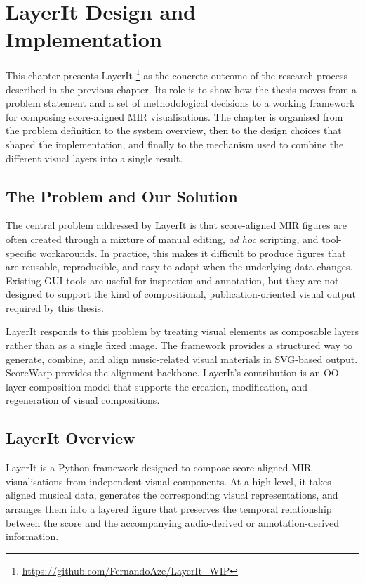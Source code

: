 \chapter{LayerIt \linebreak Design and Implementation}\label{chap:DesignAndImplementation}

This chapter presents LayerIt \footnote{\url{https://github.com/FernandoAze/LayerIt_WIP}} as the concrete outcome of the research process described in the previous chapter. Its role is to show how the thesis moves from a problem statement and a set of methodological decisions to a working framework for composing score-aligned MIR visualisations. The chapter is organised from the problem definition to the system overview, then to the design choices that shaped the implementation, and finally to the mechanism used to combine the different visual layers into a single result.

\section{The Problem and Our Solution}
The central problem addressed by LayerIt is that score-aligned MIR figures are often created through a mixture of manual editing, \textit{ad hoc} scripting, and tool-specific workarounds. In practice, this makes it difficult to produce figures that are reusable, reproducible, and easy to adapt when the underlying data changes. Existing GUI tools are useful for inspection and annotation, but they are not designed to support the kind of compositional, publication-oriented visual output required by this thesis.

LayerIt responds to this problem by treating visual elements as composable layers rather than as a single fixed image. The framework provides a structured way to generate, combine, and align music-related visual materials in SVG-based output. ScoreWarp provides the alignment backbone. LayerIt's contribution is an OO layer-composition model that supports the creation, modification, and regeneration of visual compositions.

\section{LayerIt Overview}
LayerIt is a Python framework designed to compose score-aligned MIR visualisations from independent visual components. At a high level, it takes aligned musical data, generates the corresponding visual representations, and arranges them into a layered figure that preserves the temporal relationship between the score and the accompanying audio-derived or annotation-derived information.

